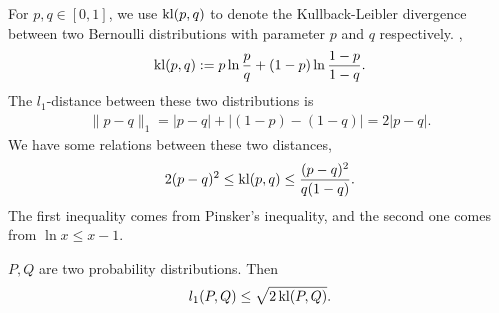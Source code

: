 For $p, q\in[0,1]$,
we use ${\mathop{\mathrm{kl}}} (p, q)$ to denote the Kullback-Leibler divergence between two
Bernoulli distributions with parameter $p$ and $q$ respectively. \ie,
\begin{equation}
    {\mathop{\mathrm{kl}}}(p,q) := p\ln\frac{p}{q} +(1-p)\ln \frac{1-p}{1-q}.
\end{equation}
The $l_1$-distance between these two distributions is
\begin{align}
    \|p-q\|_1 = |p-q|+|(1-p)-(1-q)| = 2|p-q|.
\end{align}
We have some relations between these two distances,
\begin{align}
    2(p-q)^2 \le {\mathop{\mathrm{kl}}}(p,q) \le \frac{(p-q)^2}{q(1-q)}.
\end{align}
The first inequality comes from Pinsker's inequality,
and the second one comes from $\ln x\le x-1$.
\begin{framed}
    \begin{fact}
        $P, Q$ are two probability distributions. Then
        \begin{align}
            l_1(P, Q) \le \sqrt{2\,{\mathop{\mathrm{kl}}}(P,Q)}.
        \end{align}
    \end{fact}
\end{framed}

